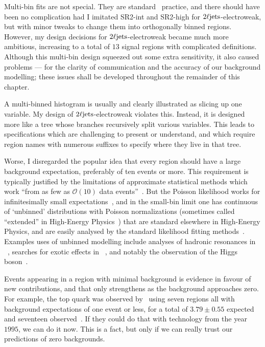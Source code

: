 Multi-bin fits are not special.
They are standard \atlas\ practice, and there should have been no complication
had I imitated SR2-int and SR2-high for $2\ell\mathrm{jets}$-electroweak, but with minor
tweaks to change them into orthogonally binned regions.
However, my design decisions for $2\ell\mathrm{jets}$-electroweak became much more
ambitious, increasing to a total of $13$ signal regions with complicated
definitions.
Although this multi-bin design squeezed out some extra sensitivity,
it also caused problems --- for the clarity of communication and the accuracy
of our background modelling;
these issues shall be developed throughout the remainder of this chapter.

A multi-binned histogram is usually and clearly illustrated as slicing up one
variable.
My design of $2\ell\mathrm{jets}$-electroweak violates this.
Instead, it is designed more like a tree whose branches recursively split
various variables.
This leads to specifications which are challenging to present or understand,
and which require region names with numerous suffixes to specify where they
live in that tree.

Worse, I disregarded the popular idea that every region should have a large
background expectation, preferably of ten events or more.
This requirement is typically justified by the limitations of approximate
statistical methods which work
``from as few as $\mathcal{O}(10)$ data events''~\cite{baak2015histfitter}.
But the Poisson likelihood works for infinitesimally small
expectations~\cite{skilling2009cosmology}, and in the small-bin limit one has
continuous of `unbinned' distributions with Poisson normalizations
(sometimes called ``extended'' in High-Energy
Physics~\cite{barlow1990extended})
that are standard elsewhere in High-Energy Physics,
and are easily analysed by the standard likelihood fitting
methods~\cite{cowan1998statistical}.
Examples uses of unbinned modelling include analyses of hadronic
resonances in
\lhcb~\cite{Tullythesis,lhcb2018563}, searches for exotic effects in
\atlas~\cite{EXOT-2018-08},
and notably the observation of the
Higgs boson~\cite{HIGG-2012-27}.

Events appearing in a region with minimal background is evidence in favour
of new contributions, and that only strengthens as the background approaches
zero.
For example, the top quark was observed by \dzero\ using seven regions all with
background expectations of one event or less, for a total of $3.79\pm0.55$
expected and seventeen observed~\cite{abachi1995observation}.
If they could do that with technology from the year $1995$, we can do it now.
This is a fact, but only if we can really trust our predictions of zero
backgrounds.

